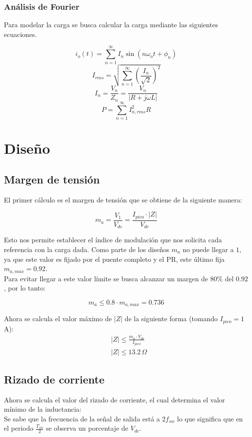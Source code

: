 \documentclass[spanish,10pt,a4paper,titlepage]{article}
\begin{document}
	\subsubsection{Análisis de Fourier}
	\noindent Para modelar la carga se busca calcular la carga mediante las siguientes ecuaciones.
	
	\[i_o(t) = \sum_{n=1}^{\infty}I_n \sin(n\omega_o t + \phi_n)\]
	\[I_{rms} = \sqrt{\sum_{n=1}^{\infty} \left(\frac{I_n}{\sqrt{2}}\right)^2}\]
	\[I_n = \frac{V_n}{Z_n} = \frac{V_n}{|R + j\omega L|}\]
	\[P = \sum_{n=1}^{\infty} I_{n,rms}^2	R\]
	
	\section{Diseño}
	\subsection{Margen de tensión}
	El primer cálculo es el margen de tensión que se obtiene de la siguiente manera:
	
	\[m_a = \frac{V_1}{V_{dc}}= \frac{I_{pico} \cdot |Z|}{V_{dc}}\]
	
	\noindent Esto nos permite establecer el índice de modulación que nos solicita cada referencia con la carga dada. Como parte de los diseños $m_a$ no puede llegar a $1$, ya que este valor es fijado por el puente completo y el PR, este último fija $m_{a,max} = 0.92$.\\
	
	Para evitar llegar a este valor límite se busca alcanzar un margen de $80\%$ del $0.92$, por lo tanto:
	
	\[m_a \leq 0.8 \cdot m_{a,max} = 0.736 \]
	
	Ahora se calcula el valor máximo de $|Z|$ de la siguiente forma (tomando $I_{pico} = 1$ A):
	\begin{align*}
		&|Z| \leq \frac{m_a \cdot V_{dc}}{I_{pico}}\\
		&|Z| \leq 13.2\, \Omega
	\end{align*}
	
	\subsection{Rizado de corriente}
	Ahora se calcula el valor del rizado de corriente, el cual determina el valor mínimo de la inductancia:\\
	
	Se sabe que la frecuencia de la señal de salida está a $2f_{sw}$ lo que significa que en el periodo $\frac{T_{sw}}{2}$ se observa un porcentaje de $V_{dc}$. 
	
\end{document}
